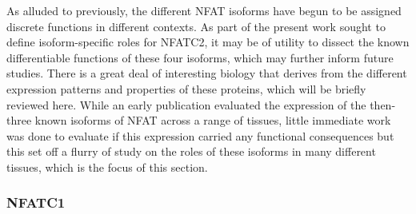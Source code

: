 As alluded to previously, the different NFAT isoforms have begun to be assigned discrete functions in different contexts. As part of the present work sought to define isoform\hyp{}specific roles for NFATC2, it may be of utility to dissect the known differentiable functions of these four isoforms, which may further inform future studies. There is a great deal of interesting biology that derives from the different expression patterns and properties of these proteins, which will be briefly reviewed here. While an early publication \citep{Masuda1995} evaluated the expression of the then\hyp{}three known isoforms of NFAT across a range of tissues, little immediate work was done to evaluate if this expression carried any functional consequences but this set off a flurry of study on the roles of these isoforms in many different tissues, which is the focus of this section. 

\subsubsection{NFATC1}\label{nfatc1}

